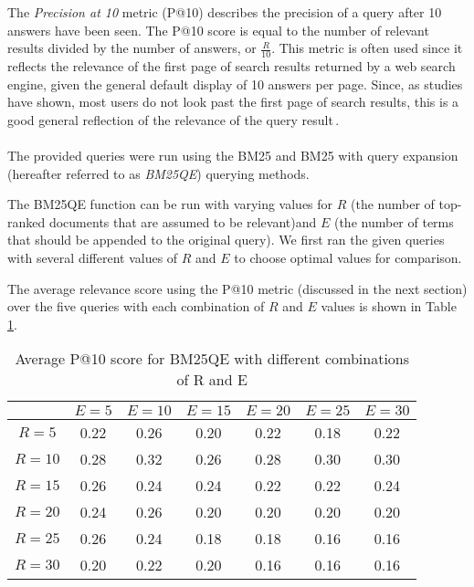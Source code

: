 The \textit{Precision at 10} metric (P@10) describes the precision of a query after 10 answers have been seen. The P@10 score is equal to the number of relevant results divided by the number of answers, or $\frac{R}{10}$. This metric is often used since it reflects the relevance of the first page of search results returned by a web search engine, given the general default display of 10 answers per page. Since, as studies have shown, most users do not look past the first page of search results, this is a good general reflection of the relevance of the query result\,\cite{scholer13eval}\cite[p. 161]{manning2008introduction}.

\paragraph*{}
The provided queries were run using the BM25 and BM25 with query expansion (hereafter referred to as \textit{BM25QE}) querying methods.

The BM25QE function can be run with varying values for $R$ (the number of top-ranked documents that are assumed to be relevant)and $E$ (the number of terms that should be appended to the original query). We first ran the given queries with several different values of $R$ and $E$ to choose optimal values for comparison.

The average relevance score using the P@10 metric (discussed in the next section) over the five queries with each combination of $R$ and $E$ values is shown in Table \ref{table:BM25QEtest}.

\begin{table}
\begin{center}
\begin{tabular}{ c | c c c c c c }
	        &$E=5$ &$E=10$&$E=15$&$E=20$&$E=25$&$E=30$\\
	\hline
	$R=5$   & 0.22 & 0.26 & 0.20 & 0.22 & 0.18 & 0.22\\
	$R=10$  & 0.28 & 0.32 & 0.26 & 0.28 & 0.30 & 0.30\\
	$R=15$  & 0.26 & 0.24 & 0.24 & 0.22 & 0.22 & 0.24\\
	$R=20$  & 0.24 & 0.26 & 0.20 & 0.20 & 0.20 & 0.20\\
	$R=25$  & 0.26 & 0.24 & 0.18 & 0.18 & 0.16 & 0.16\\
	$R=30$  & 0.20 & 0.22 & 0.20 & 0.16 & 0.16 & 0.16\\
\end{tabular}
\end{center}
\caption {Average P@10 score for BM25QE with different combinations of R and E}\label{table:BM25QEtest}
\end{table}

